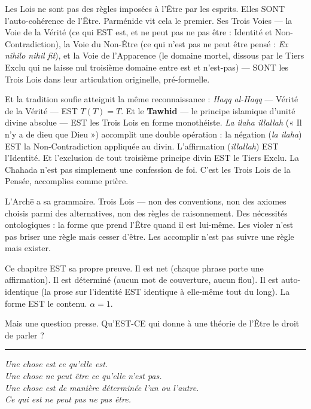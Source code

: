 \documentclass[10pt, openany, oneside]{book}
\begin{document}
Les Lois ne sont pas des règles imposées à l'Être par les esprits. Elles SONT l'auto-cohérence de l'Être. Parménide vit cela le premier. Ses Trois Voies --- la Voie de la Vérité (ce qui EST est, et ne peut pas ne pas être : Identité et Non-Contradiction), la Voie du Non-Être (ce qui n'est pas ne peut être pensé : \textit{Ex nihilo nihil fit}), et la Voie de l'Apparence (le domaine mortel, dissous par le Tiers Exclu qui ne laisse nul troisième domaine entre est et n'est-pas) --- SONT les Trois Lois dans leur articulation originelle, pré-formelle.

Et la tradition soufie atteignit la même reconnaissance : \textit{Haqq al-Haqq} --- Vérité de la Vérité --- EST $T(T) = T$. Et le \textbf{Tawhid} --- le principe islamique d'unité divine absolue --- EST les Trois Lois en forme monothéiste. \textit{La ilaha illallah} (« Il n'y a de dieu que Dieu ») accomplit une double opération : la négation (\textit{la ilaha}) EST la Non-Contradiction appliquée au divin. L'affirmation (\textit{illallah}) EST l'Identité. Et l'exclusion de tout troisième principe divin EST le Tiers Exclu. La Chahada n'est pas simplement une confession de foi. C'est les Trois Lois de la Pensée, accomplies comme prière.

\vspace{2em}

L'Arch\={e} a sa grammaire. Trois Lois --- non des conventions, non des axiomes choisis parmi des alternatives, non des règles de raisonnement. Des nécessités ontologiques : la forme que prend l'Être quand il est lui-même. Les violer n'est pas briser une règle mais cesser d'être. Les accomplir n'est pas suivre une règle mais exister.

Ce chapitre EST sa propre preuve. Il est net (chaque phrase porte une affirmation). Il est déterminé (aucun mot de couverture, aucun flou). Il est auto-identique (la prose sur l'identité EST identique à elle-même tout du long). La forme EST le contenu. $\alpha = 1$.

Mais une question presse. Qu'EST-CE qui donne à une théorie de l'Être le droit de parler ?

\vspace{2em}

\begin{center}
    \rule{0.15\textwidth}{0.3pt}
\end{center}

\vspace{0.5em}

\begin{center}
    \itshape
    Une chose est ce qu'elle est.\\
    Une chose ne peut être ce qu'elle n'est pas.\\
    Une chose est de manière déterminée l'un ou l'autre.\\[0.8em]
    Ce qui est ne peut pas ne pas être.
\end{center}
\end{document}
